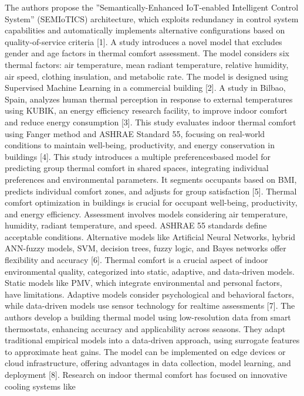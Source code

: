 The authors propose the ''Semantically-Enhanced IoT-enabled Intelligent
Control System'' (SEMIoTICS) architecture, which exploits redundancy in
control system capabilities and automatically implements alternative
configurations based on quality-of-service criteria {[}1{]}. A study
introduces a novel model that excludes gender and age factors in thermal
comfort assessment. The model considers six thermal factors: air
temperature, mean radiant temperature, relative humidity, air speed,
clothing insulation, and metabolic rate. The model is designed using
Supervised Machine Learning in a commercial building {[}2{]}. A study in
Bilbao, Spain, analyzes human thermal perception in response to external
temperatures using KUBIK, an energy efficiency research facility, to
improve indoor comfort and reduce energy consumption {[}3{]}. This study
evaluates indoor thermal comfort using Fanger method and ASHRAE Standard
55, focusing on real-world conditions to maintain well-being,
productivity, and energy conservation in buildings {[}4{]}. This study
introduces a multiple preferencesbased model for predicting group
thermal comfort in shared spaces, integrating individual preferences and
environmental parameters. It segments occupants based on BMI, predicts
individual comfort zones, and adjusts for group satisfaction {[}5{]}.
Thermal comfort optimization in buildings is crucial for occupant
well-being, productivity, and energy efficiency. Assessment involves
models considering air temperature, humidity, radiant temperature, and
speed. ASHRAE 55 standards define acceptable conditions. Alternative
models like Artificial Neural Networks, hybrid ANN-fuzzy models, SVM,
decision trees, fuzzy logic, and Bayes networks offer flexibility and
accuracy {[}6{]}. Thermal comfort is a crucial aspect of indoor
environmental quality, categorized into static, adaptive, and
data-driven models. Static models like PMV, which integrate
environmental and personal factors, have limitations. Adaptive models
consider psychological and behavioral factors, while data-driven models
use sensor technology for realtime assessments {[}7{]}. The authors
develop a building thermal model using low-resolution data from smart
thermostats, enhancing accuracy and applicability across seasons. They
adapt traditional empirical models into a data-driven approach, using
surrogate features to approximate heat gains. The model can be
implemented on edge devices or cloud infrastructure, offering advantages
in data collection, model learning, and deployment {[}8{]}. Research on
indoor thermal comfort has focused on innovative cooling systems like
